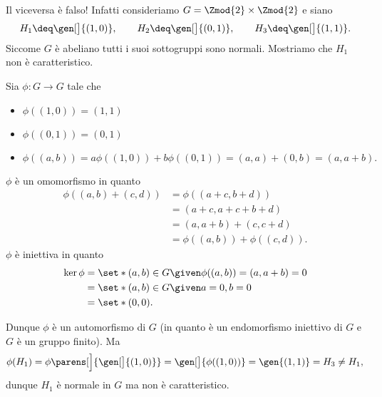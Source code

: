 \begin{remark}
    Il viceversa è falso! Infatti consideriamo $G = \Zmod{2} \times \Zmod{2}$ e siano \[
        H_1 \deq \gen[\big]{(1, 0)}, \qquad H_2 \deq \gen[\big]{(0, 1)}, \qquad H_3 \deq \gen[\big]{(1, 1)}.
    \] Siccome $G$ è abeliano tutti i suoi sottogruppi sono normali. Mostriamo che $H_1$ non è caratteristico.

    Sia $\phi : G \to G$ tale che \begin{itemize}
        \item $\phi((1, 0)) = (1, 1)$
        \item $\phi((0, 1)) = (0, 1)$
        \item $\phi((a, b)) = a\phi((1, 0)) + b\phi((0, 1)) = (a, a) + (0, b) = (a, a + b).$   
    \end{itemize}

     $\phi$ è un omomorfismo in quanto \begin{align*}
        \phi((a, b) + (c, d)) 
        &= \phi((a + c, b+d)) \\
        &= (a + c, a + c + b + d) \\
        &= (a, a + b) + (c, c + d) \\
        &= \phi((a, b)) + \phi((c, d)).
    \end{align*} 
     $\phi$ è iniettiva in quanto \begin{align*}
        \ker \phi 
        &= \set*{(a, b) \in G \given \phi((a, b)) = (a, a + b) = 0} \\
        &= \set*{(a, b) \in G \given a = 0, b = 0} \\
        &= \set*{(0, 0)}.
    \end{align*}

    Dunque $\phi$ è un automorfismo di $G$ (in quanto è un endomorfismo iniettivo di $G$ e $G$ è un gruppo finito). Ma \[
        \phi(H_1) = \phi\parens[\Big]{\gen[\big]{(1, 0)}} = \gen[\big]{\phi((1, 0))} = \gen{(1, 1)} = H_3 \neq H_1,
    \] dunque $H_1$ è normale in $G$ ma non è caratteristico.
\end{remark}